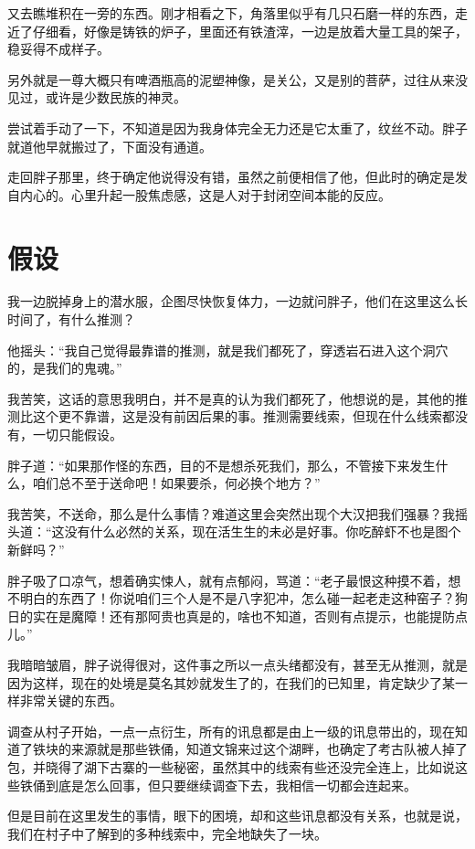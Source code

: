 又去瞧堆积在一旁的东西。刚才相看之下，角落里似乎有几只石磨一样的东西，走近了仔细看，好像是铸铁的炉子，里面还有铁渣滓，一边是放着大量工具的架子，稳妥得不成样子。

另外就是一尊大概只有啤酒瓶高的泥塑神像，是关公，又是别的菩萨，过往从来没见过，或许是少数民族的神灵。

尝试着手动了一下，不知道是因为我身体完全无力还是它太重了，纹丝不动。胖子就道他早就搬过了，下面没有通道。

走回胖子那里，终于确定他说得没有错，虽然之前便相信了他，但此时的确定是发自内心的。心里升起一股焦虑感，这是人对于封闭空间本能的反应。

\chapter{假设}

我一边脱掉身上的潜水服，企图尽快恢复体力，一边就问胖子，他们在这里这么长时间了，有什么推测？

他摇头：“我自己觉得最靠谱的推测，就是我们都死了，穿透岩石进入这个洞穴的，是我们的鬼魂。”

我苦笑，这话的意思我明白，并不是真的认为我们都死了，他想说的是，其他的推测比这个更不靠谱，这是没有前因后果的事。推测需要线索，但现在什么线索都没有，一切只能假设。

胖子道：“如果那作怪的东西，目的不是想杀死我们，那么，不管接下来发生什么，咱们总不至于送命吧！如果要杀，何必换个地方？”

我苦笑，不送命，那么是什么事情？难道这里会突然出现个大汉把我们强暴？我摇头道：“这没有什么必然的关系，现在活生生的未必是好事。你吃醉虾不也是图个新鲜吗？”

胖子吸了口凉气，想着确实悚人，就有点郁闷，骂道：“老子最恨这种摸不着，想不明白的东西了！你说咱们三个人是不是八字犯冲，怎么碰一起老走这种窑子？狗日的实在是魔障！还有那阿贵也真是的，啥也不知道，否则有点提示，也能提防点儿。”

我暗暗皱眉，胖子说得很对，这件事之所以一点头绪都没有，甚至无从推测，就是因为这样，现在的处境是莫名其妙就发生了的，在我们的已知里，肯定缺少了某一样非常关键的东西。

调查从村子开始，一点一点衍生，所有的讯息都是由上一级的讯息带出的，现在知道了铁块的来源就是那些铁俑，知道文锦来过这个湖畔，也确定了考古队被人掉了包，并晓得了湖下古寨的一些秘密，虽然其中的线索有些还没完全连上，比如说这些铁俑到底是怎么回事，但只要继续调查下去，我相信一切都会连起来。

但是目前在这里发生的事情，眼下的困境，却和这些讯息都没有关系，也就是说，我们在村子中了解到的多种线索中，完全地缺失了一块。


